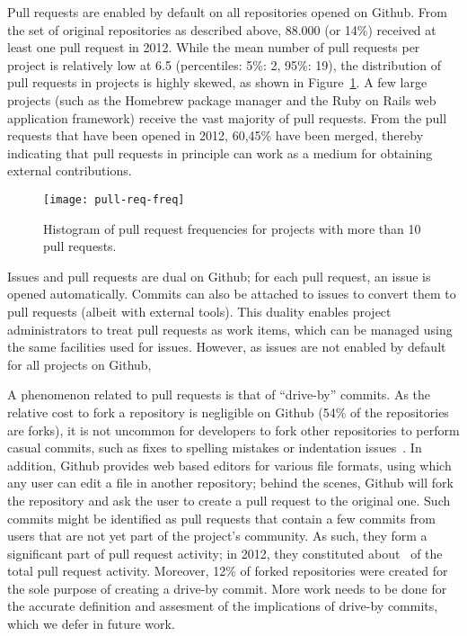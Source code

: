 \documentclass{sig-alternate}
\begin{document}
Pull requests are enabled by default on all repositories opened on Github.  From
the set of original repositories as described above, 88.000 (or 14\%) received
at least one pull request in 2012.  While the mean number of pull requests per
project is relatively low at 6.5 (percentiles: 5\%: 2, 95\%: 19), the
distribution of pull requests in projects is highly skewed, as shown in
Figure~\ref{fig:prfreq}.  A few large projects (such as the Homebrew package
manager and the Ruby on Rails web application framework) receive the vast
majority of pull requests. From the pull requests that have been opened in 2012,
60,45\% have been merged, thereby indicating that pull requests in principle can
work as a medium for obtaining external contributions.

\begin{figure}
  \begin{center}
    \texttt{[image: pull-req-freq]}
  \end{center}
  \caption{Histogram of pull request frequencies for projects with more than
  10 pull requests.}
  \label{fig:prfreq}
\end{figure}

Issues and pull requests are dual on Github; for each pull request, an
issue is opened automatically. Commits can also be attached to issues to
convert them to pull requests (albeit with external tools). This duality
enables project administrators to treat pull requests as work items,
which can be managed using the same facilities used for issues. However,
as issues are not enabled by default for all projects on Github, 

A phenomenon related to pull requests is that of ``drive-by'' commits. As the
relative cost to fork a repository is negligible on Github (54\% of the
repositories are forks), it is not uncommon for developers to fork other
repositories to perform casual commits, such as fixes to spelling mistakes or
indentation issues~\cite{Pham13}. In addition, Github provides web based editors for various
file formats, using which any user can edit a file in another repository; behind
the scenes, Github will fork the repository and ask the user to create a pull
request to the original one. Such commits might be identified as pull requests
that contain a few commits from users that are not yet part of the project's
community. As such, they form a
significant part of pull request activity; in 2012, they constituted
about~
of the total pull request activity. Moreover, 12\% of forked repositories
were created for the sole purpose of creating a drive-by commit.
More work needs to be done for the accurate definition and assesment of
the implications of drive-by commits, which we defer in future work.
\end{document}
